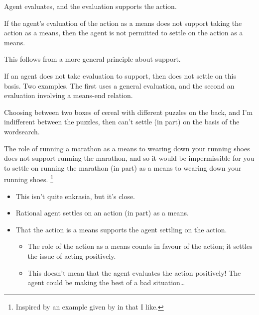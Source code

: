 \documentclass[10pt]{article}
\newcommand{\hand}{\ding{43}}
\newcommand{\hozlinedash}[0]{%
  \noindent\hdashrule[0.5ex][c]{\textwidth}{.1pt}{2.5pt}
}
\begin{document}
Agent evaluates, and the evaluation supports the action.

If the agent's evaluation of the action as a means does not support taking the action as a means, then the agent is not permitted to settle on the action as a means.

This follows from a more general principle about support.

If an agent does not take evaluation to support, then does not settle on this basis.
Two examples.
The first uses a general evaluation, and the second an evaluation involving a means-end relation.

\begin{example}
  Choosing between two boxes of cereal with different puzzles on the back, and I'm indifferent between the puzzles, then can't settle (in part) on the basis of the wordsearch.
\end{example}

\begin{example}
  The role of running a marathon as a means to wearing down your running shoes does not support running the marathon, and so it would be impermissible for you to settle on running the marathon (in part) as a means to wearing down your running shoes.\nolinebreak
  \footnote{ Inspired by an example given by \citeauthor{Bratman:1987aa} in  that I like. }
\end{example}



\begin{itemize}
\item[\hand] This isn't quite enkrasia, but it's close.
\end{itemize}

\hozlinedash

\begin{itemize}
\item Rational agent settles on an action (in part) as a means.
\item That the action is a means supports the agent settling on the action.
  \begin{itemize}
  \item The role of the action as a means counts in favour of the action; it settles the issue of acting positively.
  \item This doesn't mean that the agent evaluates the action positively!
    The agent could be making the best of a bad situation\dots
  \end{itemize}
\end{itemize}
\end{document}
